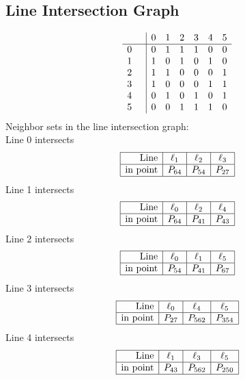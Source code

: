 \documentclass{article}
\begin{document}
{\subsection*{Line Intersection Graph}
{\arraycolsep=1pt
$$
\begin{array}{rr|*{6}r}
 &  & 0 & 1 & 2 & 3 & 4 & 5\\
\hline
0 &  & 0 & 1 & 1 & 1 & 0 & 0\\
1 &  & 1 & 0 & 1 & 0 & 1 & 0\\
2 &  & 1 & 1 & 0 & 0 & 0 & 1\\
3 &  & 1 & 0 & 0 & 0 & 1 & 1\\
4 &  & 0 & 1 & 0 & 1 & 0 & 1\\
5 &  & 0 & 0 & 1 & 1 & 1 & 0\\
\end{array}
$$
}%
Neighbor sets in the line intersection graph:\\
Line 0 intersects 
$$
\begin{array}{|r*{3}{|c}|}
\hline
\mbox{Line}  & \ell_{1} & \ell_{2} & \ell_{3}\\
\hline
\mbox{in point}  & P_{64} & P_{54} & P_{27}\\
\hline
\end{array}
$$
Line 1 intersects 
$$
\begin{array}{|r*{3}{|c}|}
\hline
\mbox{Line}  & \ell_{0} & \ell_{2} & \ell_{4}\\
\hline
\mbox{in point}  & P_{64} & P_{41} & P_{43}\\
\hline
\end{array}
$$
Line 2 intersects 
$$
\begin{array}{|r*{3}{|c}|}
\hline
\mbox{Line}  & \ell_{0} & \ell_{1} & \ell_{5}\\
\hline
\mbox{in point}  & P_{54} & P_{41} & P_{67}\\
\hline
\end{array}
$$
Line 3 intersects 
$$
\begin{array}{|r*{3}{|c}|}
\hline
\mbox{Line}  & \ell_{0} & \ell_{4} & \ell_{5}\\
\hline
\mbox{in point}  & P_{27} & P_{562} & P_{354}\\
\hline
\end{array}
$$
Line 4 intersects 
$$
\begin{array}{|r*{3}{|c}|}
\hline
\mbox{Line}  & \ell_{1} & \ell_{3} & \ell_{5}\\
\hline
\mbox{in point}  & P_{43} & P_{562} & P_{250}\\
\hline
\end{array}
$$}
\end{document}

